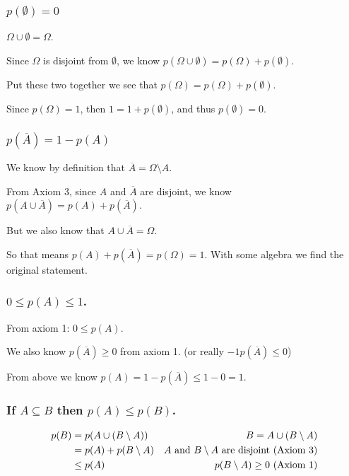 \subsubsection{$p(\emptyset) = 0$}
$\Omega \cup \emptyset = \Omega$. 

Since $\Omega$ is disjoint from $\emptyset$, 
we know $p(\Omega\cup\emptyset) = p(\Omega) + p(\emptyset)$. 

Put these two together we see that 
$p(\Omega) = p(\Omega) + p(\emptyset)$. 

Since $p(\Omega)=1$, 
then $1 = 1 + p(\emptyset)$, 
and thus $p(\emptyset) = 0$. 

\subsubsection{$p(\overline{A}) = 1-p(A)$}
We know by definition that $\overline{A} = \Omega \setminus A$. 

From Axiom 3, since $A$ and $\overline{A}$ are disjoint, 
we know $p(A\cup\overline{A}) = p(A) + p(\overline{A})$.

But we also know that $A\cup\overline{A} = \Omega$. 

So that means $ p(A) + p(\overline{A}) = p(\Omega) = 1$. 
With some algebra we find the original statement. 

\subsubsection{$0 \le p(A) \le 1$.}

From axiom 1: $0 \le p(A)$. 

We also know $p(\overline{A})\ge 0$ from axiom 1. (or really  $-1 p(\overline{A})\le 0$)

From above we know $p(A) = 1-p(\overline{A}) \le 1-0 = 1$.

\subsubsection{If $A\subseteq B$ then $p(A) \le p(B)$.}

\begin{align*}
p(B) & = p(A \cup (B\setminus A)) &			B = A \cup (B\setminus A)\\
	&= p(A) + p(B\setminus A) & A \textnormal{ and } B\setminus A \textnormal{ are disjoint (Axiom 3)} \\
	&\le p(A) 				& p(B\setminus A) \ge 0 \textnormal{ (Axiom 1)} \\
\end{align*}

